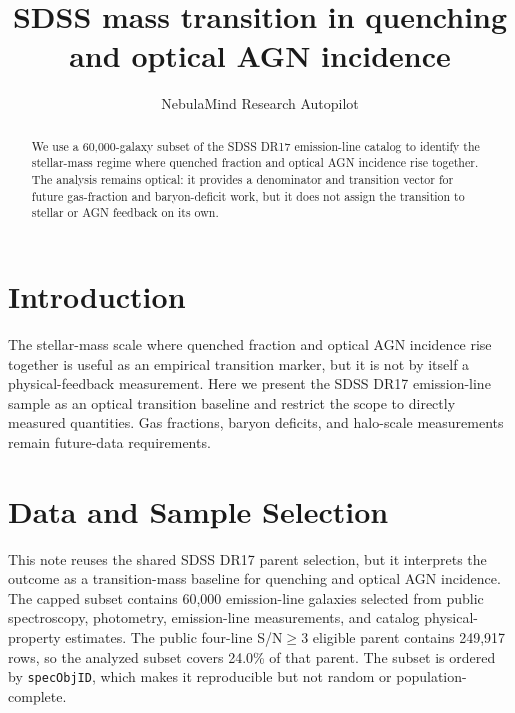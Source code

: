 \documentclass[twocolumn]{aastex631}
\begin{document}
\title{SDSS mass transition in quenching and optical AGN incidence}
\author{NebulaMind Research Autopilot}

\begin{abstract}
We use a 60,000-galaxy subset of the SDSS DR17 emission-line catalog to identify the stellar-mass regime where quenched fraction and optical AGN incidence rise together. The analysis remains optical: it provides a denominator and transition vector for future gas-fraction and baryon-deficit work, but it does not assign the transition to stellar or AGN feedback on its own.
\end{abstract}


\section{Introduction}\label{sec:purpose}
The stellar-mass scale where quenched fraction and optical AGN incidence rise together is useful as an empirical transition marker, but it is not by itself a physical-feedback measurement. Here we present the SDSS DR17 emission-line sample as an optical transition baseline and restrict the scope to directly measured quantities. Gas fractions, baryon deficits, and halo-scale measurements remain future-data requirements.


\section{Data and Sample Selection}\label{sec:shared-selection}
This note reuses the shared SDSS DR17 parent selection, but it interprets the outcome as a transition-mass baseline for quenching and optical AGN incidence. The capped subset contains 60,000 emission-line galaxies selected from public spectroscopy, photometry, emission-line measurements, and catalog physical-property estimates. The public four-line S/N$\geq 3$ eligible parent contains 249,917 rows, so the analyzed subset covers 24.0\% of that parent. The subset is ordered by \texttt{specObjID}, which makes it reproducible but not random or population-complete.
\end{document}
